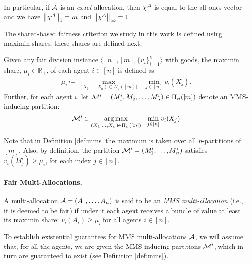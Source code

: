 In particular, if $\mathcal{A}$ is an {\it exact} allocation, then $\chi^{\mathcal{A}}$ is equal to the all-ones vector and we have $\left\|\chi^{\mathcal{A}}\right\|_1 =m$ and $\left\|\chi^{\mathcal{A}}\right\|_\infty =1$.
 
\noindent
The shared-based fairness criterion we study in this work is defined using maximin shares; these shares are defined next.
\begin{definition}\label{def:mms}
    Given any fair division instance $\langle [n], [m], \{v_i\}_{i=1}^n \rangle$ with goods, the {maximin share}, $\mu_i \in \mathbb{R}_+$, of each agent $i \in [n]$ is defined as 
    \begin{align*}
    \mu_i \coloneqq  \max_{(X_1,\dots, X_n) \in \Pi_n([m])} \ \ \min_{j\in[n]} v_i(X_{j}).
    \end{align*}
Further, for each agent $i$, let $\mathcal{M}^i=(M^i_1, M^i_2, \ldots, M^i_n) \in \Pi_n([m])$ denote an {MMS-inducing partition}:
\begin{align*}
\mathcal{M}^i \in \operatorname*{arg\,max}_{(X_1,\dots, X_n) \in \Pi_n([m])} \ \ \min_{j\in[n]} v_i(X_{j})
\end{align*}
\end{definition}

Note that in Definition \ref{def:mms} the maximum is taken over all $n$-partitions of $[m]$. Also, by definition, the partition $\mathcal{M}^i =(M^i_1, \ldots, M^i_n)$ satisfies $v_i(M^i_j) \geq \mu_i$, for each index $j \in [n]$. 

\paragraph{Fair Multi-Allocations.} A multi-allocation $\mathcal{A}=(A_1,\dots,A_n)$ is said to be an \emph{MMS multi-allocation} (i.e., it is deemed to be fair) if under it each agent receives a bundle of value at least its maximin share:  $v_i(A_i)\geq \mu_i$ for all agents $i \in [n]$.
 
To establish existential guarantees for MMS multi-allocations $\mathcal{A}$, we will assume that, for all the agents, we are given the MMS-inducing partitions $\mathcal{M}^i$, which in turn are guaranteed to exist (see Definition \ref{def:mms}).  